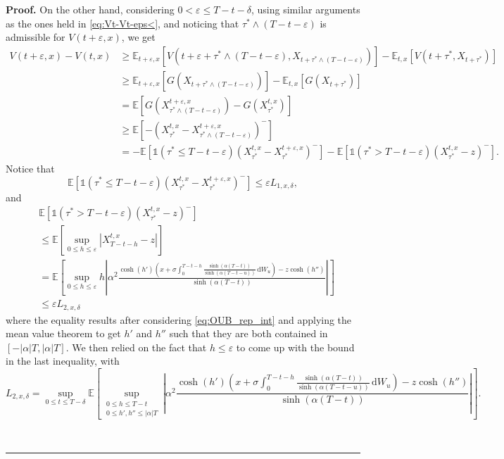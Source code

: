 \documentclass{tufte-handout}
\newcommand{\E}{\mathbb{E}} %
\newenvironment{pf}[1][Proof]{\textbf{#1.} }{\ \rule{0.5em}{0.5em}}
\begin{document}
\begin{pf}
		On the other hand, considering $0 < \varepsilon \leq T - t - \delta$, using similar arguments as the ones held in \eqref{eq:Vt-Vt-eps<}, and noticing that $\tau^*\wedge(T - t - \varepsilon)$ is admissible for $V(t + \varepsilon, x)$, we get
		\begin{align}
		V(t + \varepsilon, x) - V(t, x) &\geq \E_{t + \varepsilon, x}\left[V\left(t + \varepsilon + \tau^*\wedge(T - t - \varepsilon), X_{t + \tau^*\wedge(T - t - \varepsilon)}\right)\right] - \E_{t, x}\left[V\left(t + \tau^*, X_{t + \tau^*}\right)\right] \nonumber \\
		&\geq \E_{t + \varepsilon, x}\left[G\left(X_{t + \tau^*\wedge(T - t - \varepsilon)}\right)\right] - \E_{t, x}\left[G\left(X_{t + \tau^*}\right)\right] \nonumber \\
		&= \E\left[G\left(X_{\tau^*\wedge(T - t - \varepsilon)}^{t + \varepsilon, x}\right) - G\left(X_{\tau^*}^{t, x}\right)\right] \nonumber \\
		&\geq \E\left[-\left(X_{\tau^*}^{t, x} - X_{\tau^*\wedge(T - t -\varepsilon)}^{t + \varepsilon, x}\right)^-\right] \nonumber \\
		&= -\E\left[\mathbb{1}(\tau^*\leq T - t - \varepsilon)\left(X_{\tau^*}^{t, x} - X_{\tau^*}^{t + \varepsilon, x}\right)^-\right] - \E\left[\mathbb{1}(\tau^* > T - t - \varepsilon)\left(X_{\tau^*}^{t, x} - z\right)^-\right]. \label{eq:Vt+eps-Vt>}
		\end{align}
		Notice that
		$$
		\E\left[\mathbb{1}(\tau^*\leq T - t - \varepsilon)\left(X_{\tau^*}^{t, x} - X_{\tau^*}^{t + \varepsilon, x}\right)^-\right] \leq \varepsilon L_{1, x, \delta},
		$$
		and
		\begin{align}
			&\E\left[\mathbb{1}(\tau^* > T - t - \varepsilon)\left(X_{\tau^*}^{t, x} - z\right)^-\right] \nonumber \\
			&\leq \E\left[\sup_{0 \leq h\leq \varepsilon}\left|X_{T - t - h}^{t, x} - z\right|\right] \nonumber \\
			&= \E\left[\sup_{0 \leq h\leq \varepsilon}h\left|\alpha^2\frac{\cosh(h')\left(x + \sigma\int_{0}^{T - t -h} \frac{\sinh(\alpha (T - t))}{\sinh(\alpha (T - t - u))}\,\mathrm{d}W_u\right) - z\cosh(h'')}{\sinh(\alpha (T - t))}\right|\right] \nonumber \\
			&\leq \varepsilon L_{2, x, \delta} \nonumber
		\end{align}
		where the equality results after considering \eqref{eq:OUB_rep_int} and applying the mean value theorem to get $h'$ and $h''$ such that they are both contained in $[-|\alpha|T, |\alpha|T]$. We then relied on the fact that $h \leq \varepsilon$ to come up with the bound in the last inequality, with
		$$
		L_{2, x, \delta} = \sup_{0\leq t \leq T - \delta}\E\left[\sup_{\substack{0 \leq h \leq T - t \\ 0 \leq h', h'' \leq |\alpha|T}}\left|\alpha^2\frac{\cosh(h')\left(x + \sigma\int_{0}^{T - t - h} \frac{\sinh(\alpha (T - t))}{\sinh(\alpha (T - t - u))}\,\mathrm{d}W_u\right) - z\cosh(h'')}{\sinh(\alpha (T - t))}\right|\right].
		$$


\end{pf}
\end{document}
